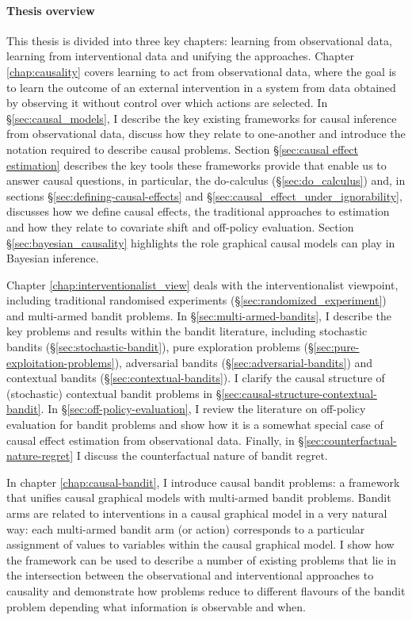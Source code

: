 \documentclass[11pt,a4paper,twoside]{report}
\theoremstyle{plain}
\theoremstyle{definition}
\begin{document}
\paragraph{Thesis overview} This thesis is divided into three key chapters: learning from observational data, learning from interventional data and unifying the approaches. Chapter \ref{chap:causality} covers learning to act from observational data, where the goal is to learn the outcome of an external intervention in a system from data obtained by observing it without control over which actions are selected. In \S\ref{sec:causal_models}, I describe the key existing frameworks for causal inference from observational data, discuss how they relate to one-another and introduce the notation required to describe causal problems. Section \S\ref{sec:causal effect estimation} describes the key tools these frameworks provide that enable us to answer causal questions, in particular, the do-calculus (\S\ref{sec:do_calculus}) and, in sections \S\ref{sec:defining-causal-effects} and \S\ref{sec:causal_effect_under_ignorability}, discusses how we define causal effects, the traditional approaches to estimation and how they relate to covariate shift and off-policy evaluation. Section \S\ref{sec:bayesian_causality} highlights the role graphical causal models can play in Bayesian inference. 

Chapter \ref{chap:interventionalist_view} deals with the interventionalist viewpoint, including traditional randomised experiments (\S\ref{sec:randomized_experiment}) and multi-armed bandit problems. In \S\ref{sec:multi-armed-bandits}, I describe the key problems and results within the bandit literature, including stochastic bandits (\S\ref{sec:stochastic-bandit}), pure exploration problems (\S\ref{sec:pure-exploitation-problems}), adversarial bandits (\S\ref{sec:adversarial-bandits}) and contextual bandits (\S\ref{sec:contextual-bandits}). I clarify the causal structure of (stochastic) contextual bandit problems in \S\ref{sec:causal-structure-contextual-bandit}. In \S\ref{sec:off-policy-evaluation}, I review the literature on off-policy evaluation for bandit problems and show how it is a somewhat special case of causal effect estimation from observational data. Finally, in \S\ref{sec:counterfactual-nature-regret} I discuss the counterfactual nature of bandit regret. 

In chapter \ref{chap:causal-bandit}, I introduce causal bandit problems: a framework that unifies causal graphical models with multi-armed bandit problems. Bandit arms are related to interventions in a causal graphical model in a very natural way: each multi-armed bandit arm (or action) corresponds to a particular assignment of values to variables within the causal graphical model. I show how the framework can be used to describe a number of existing problems that lie in the intersection between the observational and interventional approaches to causality and demonstrate how problems reduce to different flavours of the bandit problem depending what information is observable and when. 
\end{document}
